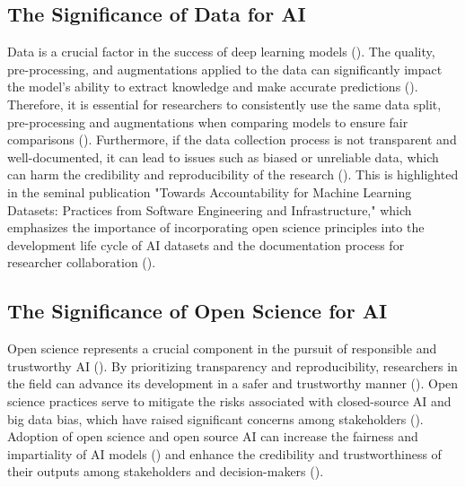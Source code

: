 \documentclass{article}
\begin{document}
\subsection{The Significance of Data for AI}

Data is a crucial factor in the success of deep learning models (\cite{lecun2015deep}). The quality, pre-processing, and augmentations applied to the data can significantly impact the model's ability to extract knowledge and make accurate predictions (\cite{shorten2019survey}). Therefore, it is essential for researchers to consistently use the same data split, pre-processing and augmentations when comparing models to ensure fair comparisons (\cite{caton2020fairness,mehrabi2021survey, leakage-recrisis}). Furthermore, if the data collection process is not transparent and well-documented, it can lead to issues such as biased or unreliable data, which can harm the credibility and reproducibility of the research (\cite{accountabilityInAi}). 
 This is highlighted in the seminal publication "Towards Accountability for Machine Learning Datasets: Practices from Software Engineering and Infrastructure," which emphasizes the importance of incorporating open science principles into the development life cycle of AI datasets and the documentation process for researcher collaboration (\cite{accountabilityInAi}).








\subsection{The Significance of Open Science for AI}

 
Open science represents a crucial component in the pursuit of responsible and trustworthy AI (\cite{floridi2019establishing,coro2020open,braun2018open,hicks2021open}). By prioritizing transparency and reproducibility, researchers in the field can advance its development in a safer and trustworthy manner (\cite{coro2020open,floridi2018ai4people,kocak2022transparency,stodden-towardreprodicibleresearch}).
Open science practices serve to mitigate the risks associated with closed-source AI and big data bias, which have raised significant concerns among stakeholders (\cite{batarseh2020data, o2017weapons}). Adoption of open science and open source AI can increase the fairness and impartiality of AI models (\cite{stodden-towardreprodicibleresearch,accountabilityInAi,gundersen2018reproducible}) and enhance the credibility and trustworthiness of their outputs among stakeholders and decision-makers (\cite{goodman2017european,hsiao2018vtaiwan,praprotnikevaluation}). %
\end{document}
